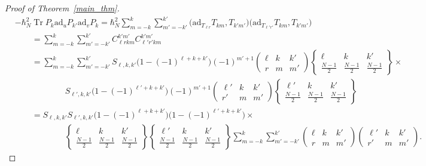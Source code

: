 \documentclass[11pt]{amsart}
\numberwithin{equation}{section}
\theoremstyle{definition}
\DeclareMathOperator{\Tr}{Tr}
\newcommand{\ad}{\mathrm{ad}}
\begin{document}
\begin{proof}[Proof of Theorem~\ref{main_thm}]
\begin{align*}
&-\hbar_N^2\Tr{P_{k}\ad_{u} P_{k'}\ad_{v} P_{k}} = \hbar_N^2\sum_{m=-k}^{k} \sum_{m'=-k'}^{k'} \big( \ad_{T_{\ell r}} T_{k m}, T_{k'm'}\big) \big( \ad_{T_{\ell' r'}} T_{k m}, T_{k'm'} \big) 
\\
&\qquad= \sum_{m=-k}^{k} \sum_{m'=-k'}^{k'} C_{\ell r k m}^{k' m'} C_{\ell' r' k m}^{k' m'}
\\
&\qquad= \sum_{m=-k}^{k} \sum_{m'=-k'}^{k'} S_{\ell,k,k'} \Big(1 - (-1)^{\ell+k+k'}\Big)(-1)^{m'+1}
\left(\begin{matrix}
\ell & k & k' \\
r & m & m'
\end{matrix}
\right)
\left\{\begin{matrix}
\ell & k & k' \\
\frac{N-1}{2} & \frac{N-1}{2} & \frac{N-1}{2}
\end{matrix}
\right\} \times
\\
&\qquad\qquad\qquad
S_{\ell',k,k'} \Big(1 - (-1)^{\ell'+k+k'}\Big)(-1)^{m'+1}
\left(\begin{matrix}
\ell' & k & k' \\
r' & m & m'
\end{matrix}
\right)
\left\{\begin{matrix}
\ell' & k & k' \\
\frac{N-1}{2} & \frac{N-1}{2} & \frac{N-1}{2}
\end{matrix}
\right\} \\ 
&\qquad= S_{\ell,k,k'}S_{\ell',k,k'} \Big(1 - (-1)^{\ell+k+k'}\Big) \Big(1 - (-1)^{\ell'+k+k'}\Big)  \times
\\
&\qquad\qquad\qquad \left\{\begin{matrix}
\ell & k & k' \\
\frac{N-1}{2} & \frac{N-1}{2} & \frac{N-1}{2}
\end{matrix}
\right\}  \left\{\begin{matrix}
\ell' & k & k' \\
\frac{N-1}{2} & \frac{N-1}{2} & \frac{N-1}{2}
\end{matrix}
\right\} 
\sum_{m=-k}^{k} \sum_{m'=-k'}^{k'} 
\left(\begin{matrix}
\ell & k & k' \\
r & m & m'
\end{matrix}
\right)
\left(\begin{matrix}
\ell' & k & k' \\
r' & m & m'
\end{matrix}
\right).
\end{align*}

\end{proof}
\end{document}
